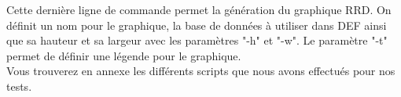 Cette dernière ligne de commande permet la génération du graphique RRD. On définit un nom pour le graphique, la base de données à utiliser dans DEF ainsi que sa hauteur et sa largeur avec les paramètres "-h" et "-w". Le paramètre "-t" permet de définir une légende pour le graphique. \\

Vous trouverez en annexe les différents scripts que nous avons effectués pour nos tests.\\


\newpage		
